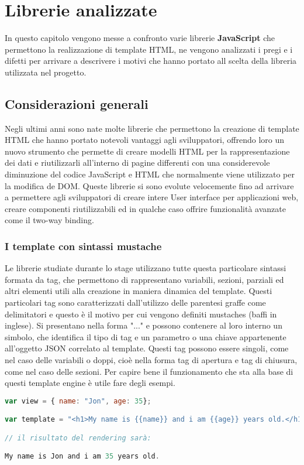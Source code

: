 
\chapter{Librerie analizzate}
\label{cap:librerie-analizzate}
In questo capitolo vengono messe a confronto varie librerie \textbf{JavaScript} che permettono la realizzazione di template HTML, ne vengono analizzati i pregi e i difetti per arrivare a descrivere i motivi che hanno portato all scelta della libreria utilizzata nel progetto.

\section{Considerazioni generali}
Negli ultimi anni sono nate molte librerie che permettono la creazione di template HTML che hanno portato notevoli vantaggi agli sviluppatori, offrendo loro un nuovo strumento che permette di creare modelli HTML per la rappresentazione dei dati e riutilizzarli all'interno di pagine differenti con una considerevole diminuzione del codice JavaScript e HTML che normalmente viene utilizzato per la modifica de DOM.
Queste librerie si sono evolute velocemente fino ad arrivare a permettere agli sviluppatori di creare intere User interface per applicazioni web, creare componenti riutilizzabili ed in qualche caso offrire funzionalità avanzate come il two-way binding.

\subsection{I template con sintassi mustache}
Le librerie studiate durante lo stage utilizzano tutte questa particolare sintassi formata da tag, che permettono di rappresentano variabili, sezioni, parziali ed altri elementi utili alla creazione in maniera dinamica del template.
Questi particolari tag sono caratterizzati dall'utilizzo delle parentesi graffe come delimitatori e questo è il motivo per cui vengono definiti mustaches (baffi in inglese).
Si presentano nella forma "{{...}}" e possono contenere al loro interno un simbolo, che identifica il tipo di tag e un parametro o una chiave appartenente all'oggetto JSON correlato al template.
Questi tag possono essere singoli, come nel caso delle variabili o doppi, cioè nella forma tag di apertura e tag di chiusura, come nel caso delle sezioni.
Per capire bene il funzionamento che sta alla base di questi template engine è utile fare degli esempi.
\begin{lstlisting}[language=JavaScript, caption=Esempio di template rappresentante una variabile.]
var view = { name: "Jon", age: 35};

var template = "<h1>My name is {{name}} and i am {{age}} years old.</h1>";

// il risultato del rendering sarà:

My name is Jon and i am 35 years old.
\end{lstlisting}

